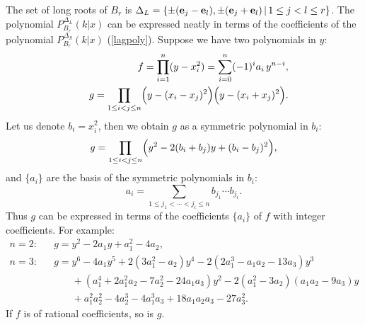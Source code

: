 \documentclass[a4paper,12pt]{article}
\begin{document}
The set of long roots of $B_r$ is $\Delta_L=\{\pm({\bf e}_j-{\bf e}_l),
\pm({\bf e}_j+{\bf e}_l)\,|\,1\leq j<l\leq r\}$.
The polynomial $P_{B_r}^{\Delta_L}(k|x)$ can be expressed neatly in terms of
the coefficients of the polynomial $P_{B_r}^{\Delta_S}(k|x)$ (\ref{lagpoly}).
Suppose we have two polynomials in $y$:
\begin{eqnarray}
    &&f=\prod_{i=1}^n(y-x_i^2)=\sum_{i=0}^n(-1)^ia_i\,y^{n-i},\\
%
    &&g=\prod_{1\leq i<j\leq n}
    \Bigl(y-(x_i-x_j)^2\Bigr)\Bigl(y-(x_i+x_j)^2\Bigr).
\end{eqnarray}
Let us denote $b_i=x_i^2$, then we obtain $g$ as a symmetric polynomial
in $b_i$:
\begin{equation}
   g=\prod_{1\leq i<j\leq n}\Bigl(y^2-2(b_i+b_j)y+(b_i-b_j)^2\Bigr),
\end{equation}
and $\{a_i\}$ are the basis of the  symmetric polynomials in $b_i$:
\begin{equation}
   a_i=\sum_{1\leq j_1<\cdots<j_i\leq n}b_{j_1}\cdots b_{j_i}.
\end{equation}
Thus $g$ can be expressed in terms of the coefficients $\{a_i\}$ of
$f$ with integer coefficients. For example:
\begin{eqnarray}
    n=2:&&g=y^2-2a_1y+a_1^2-4a_2,\label{rfgrel1}\\
%
    n=3:&&g=y^6-4a_1y^5+2(3a_1^2-a_2)y^4-2(2a_1^3-a_1a_2-13a_3)y^3\nonumber\\
%
    &&\phantom{g=}
    +(a_1^4+2a_1^2a_2-7a_2^2-24a_1a_3)y^2-2(a_1^2-3a_2)(a_1a_2-9a_3)y
    \nonumber\\
%
    &&\phantom{g=}
    +a_1^2a_2^2-4a_2^3-4a_1^3a_3+18a_1a_2a_3-27a_3^2.
    \label{rfgrel2}
\end{eqnarray}
If $f$ is of rational coefficients, so is $g$.
\end{document}
